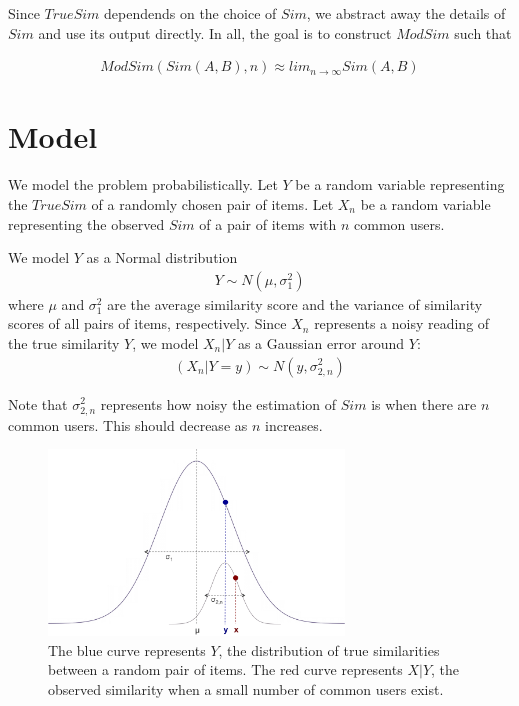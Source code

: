 \documentclass[11pt]{article}
\begin{document}
Since $TrueSim$ dependends on the choice of $Sim$, we abstract away the details
of $Sim$ and use its output directly. In all, the goal is to construct $ModSim$
such that

\begin{align}
ModSim(Sim(A, B), n) \approx lim_{n\to\infty}Sim(A, B)
\end{align}

\section*{Model}

We model the problem probabilistically. Let $Y$ be a random variable
representing the $TrueSim$ of a randomly chosen pair of items. Let $X_n$ be a
random variable representing the observed $Sim$ of a pair of items with $n$
common users.

We model $Y$ as a Normal distribution 
\begin{align}
Y \sim N(\mu, \sigma_{1}^2)
\end{align}
where $\mu$ and $\sigma_{1}^2$ are the average similarity score and the variance
of similarity scores of all pairs of items, respectively. Since $X_n$ represents
a noisy reading of the true similarity $Y$, we model $X_n | Y$ as a Gaussian
error around $Y$:
\begin{align}
(X_n | Y=y) \sim N(y, \sigma_{2, n}^2)
\end{align}

Note that $\sigma_{2, n}^2$ represents how noisy the estimation of $Sim$ is when
there are $n$ common users. This should decrease as $n$ increases.

\begin{figure}[!htbp]
    \centering
    \includegraphics[width=0.7\textwidth]{twonormals.png}
	\caption{The blue curve represents $Y$, the distribution of true
    similarities between a random pair of items. The red curve represents $X|Y$,
    the observed similarity when a small number of common users exist.}
    \label{fig:two_normals}
\end{figure}
\end{document}
